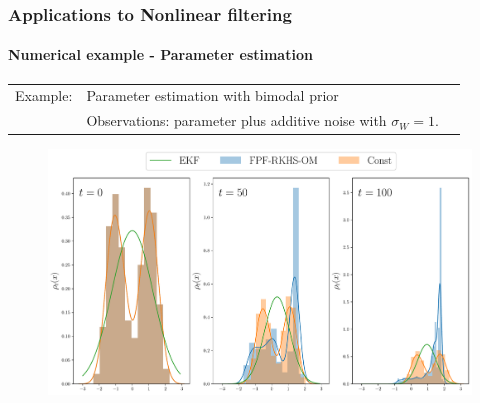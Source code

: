 \documentclass[xcolor=dvipsnames, subsection=false]{beamer}
\def\alertb#1{\alert{\color{BrickRed}  #1}}
\def\alertb#1{\alert{\color{BrickRed}  #1}}
\begin{document}
\begin{frame}
\begin{minipage}[t][6.5cm][t]{\textwidth}
\end{minipage}
\end{frame}

\begin{frame}
\frametitle{Applications to Nonlinear filtering}
\framesubtitle{Numerical example - Parameter estimation}
\begin{minipage}[t][6.5cm][t]{\textwidth}
	
	\begin{tabular}{lll}\alertb{Example:}   & Parameter estimation with bimodal prior
		\\
		&   Observations:  parameter plus additive noise with $\sigma_W = 1$.
	\end{tabular}
  \begin{figure}
  	\centering
	\includegraphics[width = 0.8\hsize] {Chap4_Posterior_estimate.pdf}
  \end{figure}
\end{minipage}
\end{frame}
\end{document}
